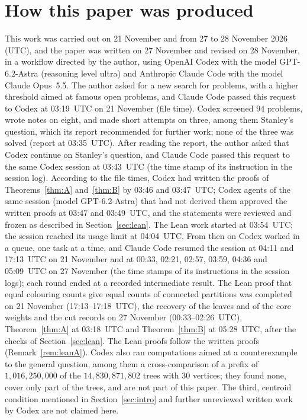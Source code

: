\documentclass[11pt]{article}
\theoremstyle{definition}
\theoremstyle{remark}
\begin{document}
\section*{How this paper was produced}
This work was carried out on 21 November and from 27 to 28 November 2026 (UTC), and the paper was written on 27 November and revised on 28 November, in a workflow directed by the author, using OpenAI Codex
with the model GPT-6.2-Astra (reasoning level ultra) and Anthropic Claude Code
with the model Claude Opus~5.5. The author asked for a new search for problems,
with a higher threshold aimed at famous open problems, and Claude Code passed
this request to Codex at 03:19~UTC on 21 November (file time). Codex screened
$94$ problems, wrote notes on eight, and made short attempts on three, among
them Stanley's question, which its report recommended for further work; none of
the three was solved (report at
03:35~UTC). After reading the report, the author asked that Codex continue on
Stanley's question, and Claude Code passed this request to the same Codex session
at 03:43~UTC (the time stamp of its instruction in the session log). According to
the file times, Codex had written the proofs of Theorems~\ref{thm:A}
and~\ref{thm:B} by 03:46 and 03:47~UTC; Codex agents of the same session (model GPT-6.2-Astra) that had not
derived them approved the written proofs at 03:47 and 03:49~UTC, and the
statements were reviewed and frozen as described in Section~\ref{sec:lean}. The
Lean work started at 03:54~UTC; the session reached its usage limit at
04:04~UTC. From then on Codex worked in a queue, one task at a time, and Claude
Code resumed the session at 04:11 and 17:13~UTC on 21 November and at 00:33,
02:21, 02:57, 03:59, 04:36 and 05:09~UTC on 27 November (the time stamps of its
instructions in the session logs); each round ended at a recorded intermediate
result. The Lean proof that equal colouring counts give equal counts of connected
partitions was completed on 21 November (17:13--17:18~UTC), the recovery of the
leaves and of the core weights and the cut records on 27 November
(00:33--02:26~UTC), Theorem~\ref{thm:A} at 03:18~UTC and Theorem~\ref{thm:B} at
05:28~UTC, after the checks of Section~\ref{sec:lean}. The Lean proofs follow the
written proofs (Remark~\ref{rem:leanA}). Codex also ran computations aimed at a
counterexample to the general question, among them a cross-comparison of a
prefix of $1{,}016{,}250{,}000$ of the $14{,}830{,}871{,}802$ trees with $30$
vertices; they found none, cover only part of the trees, and are not part of this
paper. The third, centroid condition mentioned in Section~\ref{sec:intro} and
further unreviewed written work by Codex are not claimed here.
\end{document}
